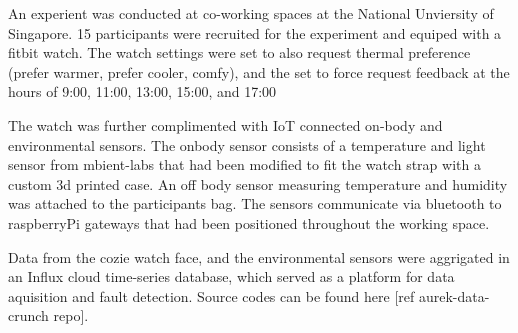 
An experient was conducted at co-working spaces at the National Unviersity of Singapore. 15 participants were recruited for the experiment and equiped with a fitbit watch. The watch settings were set to also request thermal preference (prefer warmer, prefer cooler, comfy), and the set to force request feedback at the hours of 9:00, 11:00, 13:00, 15:00, and 17:00 

The watch was further complimented with IoT connected on-body and environmental sensors. The onbody sensor consists of a temperature and light sensor from mbient-labs that had been modified to fit the watch strap with a custom 3d printed case. An off body sensor measuring temperature and humidity was attached to the participants bag. The sensors communicate via bluetooth to raspberryPi gateways that had been positioned throughout the working space. 

Data from the cozie watch face, and the environmental sensors were aggrigated in an Influx cloud time-series database, which served as a platform for data aquisition and fault detection. Source codes can be found here [ref aurek-data-crunch repo].



